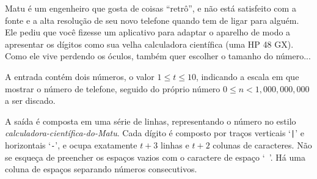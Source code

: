 
%
%
%

Matu é um engenheiro que gosta de coisas ``retrô'', e não está satisfeito com a fonte e a alta resolução de seu novo telefone quando tem de ligar para alguém. Ele pediu que você fizesse um aplicativo para adaptar o aparelho de modo a apresentar os dígitos como sua velha calculadora científica (uma HP 48 GX). Como ele vive perdendo os óculos, também quer escolher o tamanho do número...

\Entrada%
A entrada contém dois números, o valor $1 \leq t \leq 10$, indicando a escala em que mostrar o número de telefone, seguido do próprio número $0 \leq n < 1,000,000,000$ a ser discado.

\Saida%
A saída é composta em uma série de linhas, representando o número no estilo \emph{calculadora-científica-do-Matu}. Cada dígito é composto por traços verticais `\texttt{|}' e horizontais `\texttt{-}', e ocupa exatamente $t + 3$ linhas e $t + 2$ colunas de caracteres. Não se esqueça de preencher os espaços vazios com o caractere de espaço `\texttt{ }'. Há uma coluna de espaços separando números consecutivos.

%
